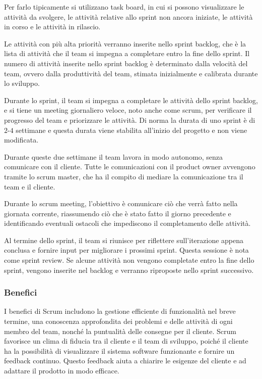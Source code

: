Per farlo tipicamente si utilizzano task board, in cui
si possono visualizzare le attività da svolgere, le attività relative allo 
sprint non ancora iniziate, le attività in corso e le attività in rilascio. 

Le attività con più alta priorità verranno inserite nello sprint backlog, che è
la lista di attività che il team si impegna a completare entro la fine dello
sprint. Il numero di attività inserite nello sprint backlog è determinato dalla
velocità del team, ovvero dalla produttività del team, stimata inizialmente e 
calibrata durante lo sviluppo.

Durante lo sprint, il team si impegna a completare le attività dello sprint
backlog, e si tiene un meeting giornaliero veloce, noto anche come scrum,
per verificare il progresso del team e priorizzare le attività. Di norma 
la durata di uno sprint è di $2$-$4$ settimane e questa durata viene stabilita all'inizio 
del progetto e non viene modificata.

Durante queste due settimane il team lavora in modo autonomo, senza comunicare 
con il cliente. Tutte le comunicazioni con il product owner avvengono
tramite lo scrum master, che ha il compito di mediare la comunicazione tra
il team e il cliente.

Durante lo scrum meeting, l'obiettivo è comunicare ciò che verrà fatto 
nella giornata corrente, riassumendo ciò che è stato fatto il giorno precedente
e identificando eventuali ostacoli che impediscono il completamento delle attività.

Al termine dello sprint, il team si riunisce per riflettere sull'iterazione appena
conclusa e fornire input per migliorare i prossimi sprint. Questa sessione è
nota come sprint review. Se alcune attività non vengono completate
entro la fine dello sprint, vengono inserite nel backlog e verranno riproposte
nello sprint successivo.

\subsubsection{Benefici}
I benefici di Scrum includono la gestione efficiente di funzionalità nel breve termine,
una conoscenza approfondita
dei problemi e delle attività di ogni membro del team, nonché la puntualità delle consegne
per il cliente. Scrum favorisce
un clima di fiducia tra il cliente e il team di sviluppo, poiché il cliente ha la possibilità
di visualizzare il sistema software
funzionante e fornire un feedback continuo. Questo feedback aiuta a chiarire le esigenze
del cliente e ad adattare il prodotto
in modo efficace.

